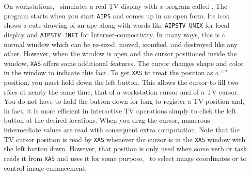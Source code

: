 
     On workstations, \AIPS\ simulates a real TV display with a
program called {\tt {}}\@.  The program starts when you start
{\tt AIPS} and comes up in an open form.  Its icon shows a cute
drawing of an ape along with words like {\tt AIPSTV UNIX} for local
display and {\tt AIPSTV INET} for Internet-connectivity.  In many
ways, this is a normal window which can be re-sized, moved, iconified,
and destroyed like any other.  However, when the window is open and
the cursor positioned inside the window, {\tt XAS} offers some
additional features.  The cursor changes shape and color in the window
to indicate this fact.  To get {\tt XAS} to treat the 
position as a ``'' position, you must hold down the
left  button.  This allows the cursor to fill two r\^oles
at nearly the same time, that of a workstation cursor and of a TV
cursor.  You do not have to hold the button down for long to register
a TV position and, in fact, it is more efficient in interactive TV
operations simply to click the left button at the desired locations.
When you drag the cursor, numerous intermediate values are read with
consequent extra computation.  Note that the TV cursor position is
read by {\tt XAS} whenever the cursor is in the {\tt XAS} window with
the left button down.  However, that position is only used when some
verb or task reads it from {\tt XAS} and uses it for some purpose,
\eg\ to select image coordinates or to control image enhancement.


